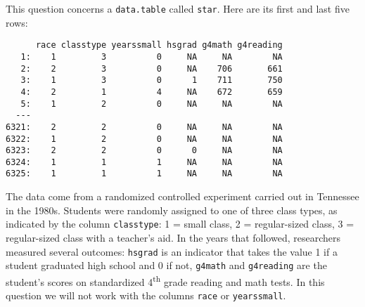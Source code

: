 \documentclass[addpoints,12pt]{exam}
\begin{document}
\begin{questions}
  \question This question concerns a \texttt{data.table} called \texttt{star}.
  Here are its first and last five rows:
  \begin{verbatim}
      race classtype yearssmall hsgrad g4math g4reading
   1:    1         3          0     NA     NA        NA
   2:    2         3          0     NA    706       661
   3:    1         3          0      1    711       750
   4:    2         1          4     NA    672       659
   5:    1         2          0     NA     NA        NA
  ---                                                  
6321:    2         2          0     NA     NA        NA
6322:    1         2          0     NA     NA        NA
6323:    2         2          0      0     NA        NA
6324:    1         1          1     NA     NA        NA
6325:    1         1          1     NA     NA        NA
  \end{verbatim}
The data come from a randomized controlled experiment carried out in Tennessee in the 1980s.
Students were randomly assigned to one of three class types, as indicated by the column \texttt{classtype}: 1 = small class, 2 = regular-sized class, 3 = regular-sized class with a teacher's aid.
In the years that followed, researchers measured several outcomes: \texttt{hsgrad} is an indicator that takes the value 1 if a student graduated high school and 0 if not, \texttt{g4math} and \texttt{g4reading} are the student's scores on standardized 4\textsuperscript{th} grade reading and math tests.
In this question we will not work with the columns \texttt{race} or \texttt{yearssmall}.
\end{questions}
\end{document}
